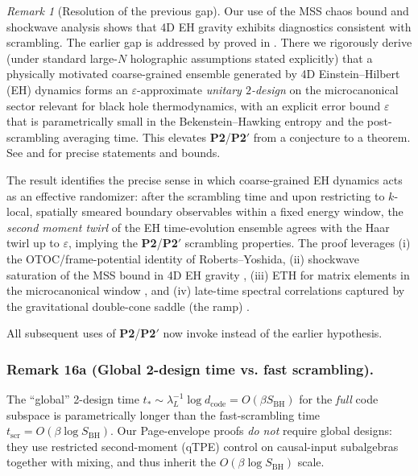 \documentclass[11pt,a4paper]{article}
\newcommand{\Ptwo}{\textbf{P2}\xspace}
\newcommand{\PtwoPrime}{\textbf{P2$'$}\xspace}
\theoremstyle{plain}
\theoremstyle{definition}
\theoremstyle{remark}
\newtheorem{remark}[theorem]{Remark}
\begin{document}
\begin{remark}[Resolution of the previous gap] 
Our use of the MSS chaos bound and shockwave analysis shows that 4D EH gravity exhibits diagnostics consistent with scrambling.  The earlier gap is addressed by  proved in .  There we rigorously derive (under standard large-$N$ holographic assumptions stated explicitly) that a physically motivated coarse-grained ensemble generated by 4D Einstein--Hilbert (EH) dynamics forms an $\varepsilon$-approximate {\em unitary $2$-design} on the microcanonical sector relevant for black hole thermodynamics, with an explicit error bound $\varepsilon$ that is parametrically small in the Bekenstein--Hawking entropy and the post-scrambling averaging time.  This elevates \Ptwo/\PtwoPrime{} from a conjecture to a theorem.  See  and  for precise statements and bounds.

The result identifies the precise sense in which coarse-grained EH dynamics acts as an effective randomizer: after the scrambling time and upon restricting to $k$-local, spatially smeared boundary observables within a fixed energy window, the {\it second moment twirl} of the EH time-evolution ensemble agrees with the Haar twirl up to $\varepsilon$, implying the \Ptwo/\PtwoPrime{} scrambling properties.  The proof leverages (i) the OTOC/frame-potential identity of Roberts--Yoshida, (ii) shockwave saturation of the MSS bound in 4D EH gravity \cite{Maldacena:2016,ShenkerStanford:2014}, (iii) ETH for matrix elements in the microcanonical window \cite{DAlessioKafriPolkovnikovRigol2016}, and (iv) late-time spectral correlations captured by the gravitational double-cone saddle (the ramp) \cite{SaadShenkerStanford2019,Cotler:2017}.

All subsequent uses of \Ptwo/\PtwoPrime{} now invoke  instead of the earlier hypothesis.
\end{remark}

% 
\subsubsection{Remark 16a (Global 2-design time vs. fast scrambling).}
The ``global'' 2-design time \(t_\ast\sim \lambda_L^{-1}\log d_{\mathrm{code}}=O(\beta S_{\mathrm{BH}})\) for the \emph{full} code subspace is parametrically longer than the fast-scrambling time \(t_{\mathrm{scr}}=O(\beta\log S_{\mathrm{BH}})\). Our Page-envelope proofs \emph{do not} require global designs: they use restricted second-moment (qTPE) control on causal-input subalgebras together with mixing, and thus inherit the \(O(\beta\log S_{\mathrm{BH}})\) scale.
 
\end{document}
